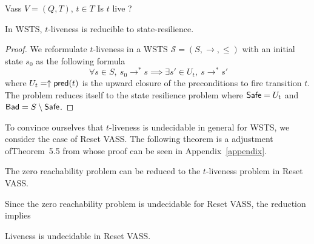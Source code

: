 {Vass $V=(Q,T)$, $t \in T$}
{Is $t$ live ?}



\begin{proposition}\label{reductions}
In WSTS, $t$-liveness is reducible to {\sc state-resilience}.
\end{proposition}


\begin{proof}
We reformulate $t$-liveness in a WSTS $\mathscr{S}=(S,\rightarrow, \leq)$ with an initial state $s_0$ as the following formula
$$ ~ \forall s \in S, ~ s_0 \rightarrow^* s \implies \exists s' \in U_t, ~ s \rightarrow^{*} s'$$  
where
$U_t=\uparrow \textsf{pred}(t)$ 
is the upward closure of the preconditions to fire transition $t$.  
The problem reduces itself to the state resilience problem
where $\textsf{Safe} = U_t$ and $\textsf{Bad} = S \setminus \textsf{Safe}$.
\end{proof}

To convince ourselves that $t$-liveness is undecidable in general for WSTS, we consider the case of Reset VASS. The following theorem is a adjustment ofTheorem~5.5 from \cite{peterson1981petri} whose proof can be seen in Appendix~\ref{appendix}.



\begin{theorem}\label{liveness reset}
The  zero reachability problem can be reduced to the $t$-liveness problem in Reset VASS.
\end{theorem}

\iffalse
\begin{proof}
See Appendix~\ref{appendix} for the complete proof.
\end{proof}
\fi

Since the zero reachability problem is undecidable for Reset VASS, the reduction implies 
%
\iffalse
\begin{corollary}
Liveness is undecidable in Reset VASS.
\end{corollary}

